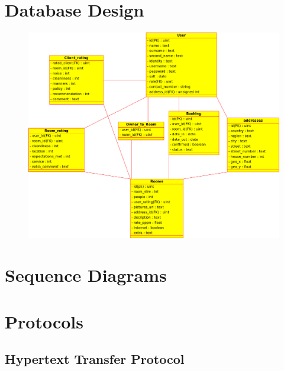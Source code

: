 \section{Database Design}
	\begin{figure}
		\includegraphics[scale=0.2]{../uml/sql_database.jpg} 
	\end{figure}
\section{Sequence Diagrams}
\section{Protocols}
\subsection*{Hypertext Transfer Protocol}

